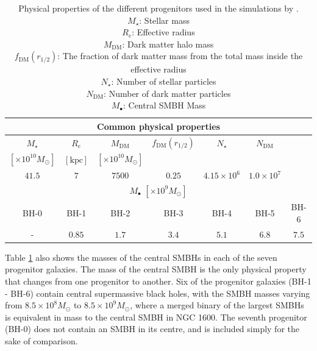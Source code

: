 \documentclass[english, oneside]{HYgradu}
\begin{document}
\begin{table}
	\begin{center}
		\begin{tabular}{| c c c c c c c |}
		\hline
		\multicolumn{7}{|c|}{Common physical properties} \\
		\hline
		$M_\star$ & $R_e$ & $M_\mathrm{DM}$ & $f_\mathrm{DM}(r_{1/2})$ & $N_\star$ & $N_\mathrm{DM}$ & \\
		$[\times 10^{10} M_\odot]$ & $\mathrm{[kpc]}$ & $[\times 10^{10} M_\odot]$ & & & & \\
		$41.5$ & $7$ & $7500$ & $0.25$ & $4.15 \times 10^6$ & $1.0 \times 10^7$ & \\
		\hline
		\hline
		\multicolumn{7}{|c|}{$M_\bullet$ $[\times10^{9} M_\odot]$} \\
		\hline
		BH-0 & BH-1 & BH-2 & BH-3 & BH-4 & BH-5 & BH-6 \\
		- & $0.85$ & $1.7$ & $3.4$ & $5.1$ & $6.8$ & $7.5$ \\
		\hline
		\end{tabular}
	\end{center}
	\caption{Physical properties of the different progenitors used in the simulations by \cite{Rantala2018}. \\
	$M_\star$: Stellar mass \\
	$R_e$: Effective radius \\
	$M_\mathrm{DM}$: Dark matter halo mass \\
	$f_\mathrm{DM}(r_{1/2})$: The fraction of dark matter mass from the total mass inside the effective radius \\
	$N_\star$: Number of stellar particles \\
	$N_\mathrm{DM}$: Number of dark matter particles \\
	$M_\bullet$: Central SMBH Mass}
	\label{table:properties}
\end{table}

Table \ref{table:properties} also shows the masses of the central SMBHs in each of the seven progenitor galaxies. The mass of the central SMBH is the only physical property that changes from one progenitor to another. Six of the progenitor galaxies (BH-1 - BH-6) contain central supermassive black holes, with the SMBH masses varying from $8.5 \times 10^8 M_\odot$ to $8.5 \times 10^9 M_\odot$, where a merged binary of the largest SMBHs is equivalent in mass to the central SMBH in NGC 1600. The seventh progenitor (BH-0) does not contain an SMBH in its centre, and is included simply for the sake of comparison.
\end{document}
